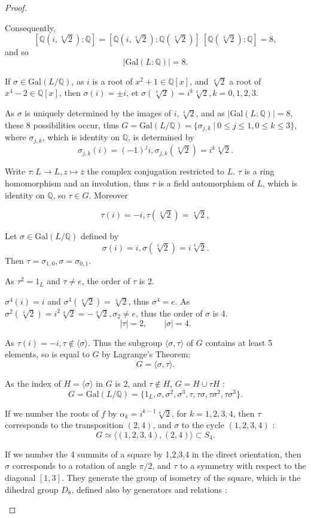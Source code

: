 \documentclass[11pt,a4paper]{article}
\newcommand{\Q}{\mathbb{Q}}
\newcommand{\Gal}{\mathrm{Gal}}
\begin{document}
\begin{proof}
\begin{enumerate}
Consequently, 
$$[\Q(i,\sqrt[4]{2}) : \Q] = [\Q(i,\sqrt[4]{2}) : \Q(\sqrt[4]{2})] \ [\Q(\sqrt[4]{2}) : \Q]  = 8,$$
and so
$$\vert \Gal(L:\Q) \vert = 8.$$

If $\sigma \in \Gal(L/\Q)$, as $i$ is a root of $x^2+1 \in \Q[x]$, and $\sqrt[4]{2}$ a root of $x^4-2 \in \Q[x]$, then $\sigma(i) = \pm i$, et $\sigma(\sqrt[4]{2}) = i^k \sqrt[4]{2},k=0,1,2,3$.

As $\sigma$ is uniquely determined by the images of $ i,\sqrt[4]{2}$, and as $\vert \Gal(L:\Q) \vert = 8$, these 8 possibilities occur, thus $G=\Gal(L/\Q) = \{\sigma_{j,k} \ \vert \ 0\leq j \leq1, 0 \leq k \leq 3 \}$, where $\sigma_{j,k}$, which is identity on $\Q$, is determined by
$$\sigma_{j,k}(i) = (-1)^j i, \sigma_{j,k}(\sqrt[4]{2}) = i^k \sqrt[4]{2}.$$

Write $\tau :L \to L, z \mapsto \overline{z}$ the complex conjugation restricted to $L$. $\tau$ is a ring homomorphism and an involution, thus $\tau$ is a field automorphism of $L$, which is identity on $\Q$, so $\tau \in G$. Moreover 

$$ \tau(i) = -i, \tau(\sqrt[4]{2}) = \sqrt[4]{2},$$

Let $\sigma \in \Gal(L/\Q)$ defined by $$\sigma(i)=i, \sigma(\sqrt[4]{2}) = i \sqrt[4]{2}.$$
Then  $\tau = \sigma_{1,0}, \sigma = \sigma_{0,1}$.

As $\tau^2 = 1_L$ and $\tau \neq e$, the order of $\tau$ is 2.

$\sigma^4(i) = i$ and $\sigma^4(\sqrt[4]{2}) = \sqrt[4]{2}$, thus $\sigma^4 = e$. As $\sigma^2(\sqrt[4]{2}) = i^2 \sqrt[4]{2}=-\sqrt[4]{2},\sigma_2 \neq e$, thus the order of $\sigma$ is 4.
$$|\tau| = 2, \qquad |\sigma| = 4.$$

As $\tau(i) = -i, \tau \not \in \langle \sigma \rangle$. Thus the subgroup $\langle \sigma, \tau \rangle$ of $G$ contains at least 5 elements, so is equal to $G$ by Lagrange's Theorem:
$$G = \langle \sigma, \tau \rangle.$$

As the index of  $H = \langle \sigma \rangle$ in $G$ is 2, and $\tau \not \in H$, $G = H \cup \tau H$ :
 $$ G=\Gal(L/\Q) = \{1_{L}, \sigma, \sigma^2, \sigma^3,\tau,  \tau \sigma, \tau \sigma^2, \tau \sigma^3\}.$$

If we number the roots of $f$ by  $\alpha_k=  i^{k-1} \sqrt[4]{2}$, for $k=1,2,3,4$, then $\tau$ corresponds to the transposition $(2,4)$, and $\sigma$ to the cycle $(1,2,3,4)$ :
$$G\simeq \langle(1,2,3,4),(2,4)\rangle \subset S_4.$$

If we number the 4 summits of a square by 1,2,3,4 in the direct orientation, then $\sigma$ corresponds to a rotation of angle $\pi/2$, and $\tau$ to a symmetry with respect to the diagonal $[1,3]$. They generate the group of isometry of the square, which is the dihedral group $D_8$, defined also by generators and relations :


\end{enumerate}
\end{proof}
\end{document}
